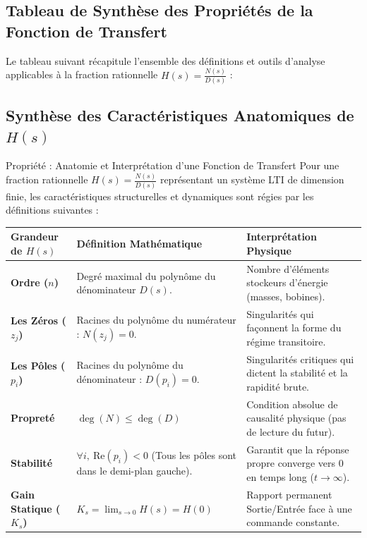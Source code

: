 \documentclass[11pt,a4paper]{report}
\begin{document}
\subsection{Tableau de Synthèse des Propriétés de la Fonction de Transfert}

Le tableau suivant récapitule l'ensemble des définitions et outils d'analyse applicables à la fraction rationnelle $H(s) = \frac{N(s)}{D(s)}$ :


    
\subsection{Synthèse des Caractéristiques Anatomiques de $H(s)$}

\begin{importantbox}{Propriété : Anatomie et Interprétation d'une Fonction de Transfert}
    Pour une fraction rationnelle $H(s) = \frac{N(s)}{D(s)}$ représentant un système LTI de dimension finie, les caractéristiques structurelles et dynamiques sont régies par les définitions suivantes :
    
    \begin{center}
    \small
    \renewcommand{\arraystretch}{1.4}
    \begin{tabular}{|l|p{5.8cm}|p{4.2cm}|}
    \hline
    \textbf{Grandeur de $H(s)$} & \textbf{Définition Mathématique} & \textbf{Interprétation Physique} \\ \hline
    \textbf{Ordre ($n$)} & Degré maximal du polynôme du dénominateur $D(s)$. & Nombre d'éléments stockeurs d'énergie (masses, bobines). \\ \hline
    \textbf{Les Zéros ($z_j$)} & Racines du polynôme du numérateur : $N(z_j) = 0$. & Singularités qui façonnent la forme du régime transitoire. \\ \hline
    \textbf{Les Pôles ($p_i$)} & Racines du polynôme du dénominateur : $D(p_i) = 0$. & Singularités critiques qui dictent la stabilité et la rapidité brute. \\ \hline
    \textbf{Propreté} & $\deg(N) \le \deg(D)$ & Condition absolue de causalité physique (pas de lecture du futur). \\ \hline
    \textbf{Stabilité} & $\forall i, \ \text{Re}(p_i) < 0$ (Tous les pôles sont dans le demi-plan gauche). & Garantit que la réponse propre converge vers $0$ en temps long ($t \to \infty$). \\ \hline
    \textbf{Gain Statique ($K_s$)} & $K_s = \lim_{s \to 0} H(s) = H(0)$ & Rapport permanent Sortie/Entrée face à une commande constante. \\ \hline
    \end{tabular}
    \end{center}
\end{importantbox}
\end{document}
